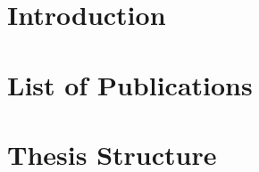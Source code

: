 \section[Introduction]{Introduction}\label{sec:introduction}



\section[Publications]{List of Publications}\label{sec:publications}


\section{Thesis Structure}




